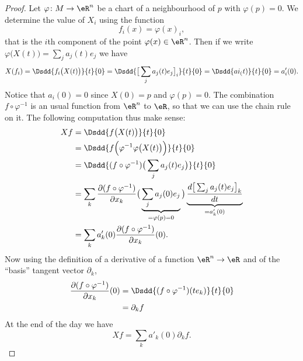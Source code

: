 \begin{proof}
    Let \( \varphi\colon M\to \eR^n\) be a chart of a neighbourhood of \( p\) with \( \varphi(p)=0\). We determine the value of \( X_i\) using the function
    \begin{equation}
        f_i(x)=\varphi(x)_i,
    \end{equation}
    that is the \( i\)th component of the point \( \varphi(x)\in\eR^n\). Then if we write \( \varphi\big( X(t) \big)=\sum_j a_j(t)e_j\) we have
    \begin{subequations}
        \begin{align}
            X(f_i)=\Dsdd{ f_i\big( X(t) \big) }{t}{0}=\Dsdd{ \big[ \sum_ja_j(t)e_j \big]_i }{t}{0}=\Dsdd{ ai_(t) }{t}{0}=a_i'(0).
        \end{align}
    \end{subequations}
    Notice that \( a_i(0)=0\) since \( X(0)=p\) and \( \varphi(p)=0\). The combination \( f\circ\varphi^{-1}\) is an usual function from \( \eR^n\) to \( \eR\), so that we can use the chain rule on it. The following computation thus make sense:
    \begin{subequations}
        \begin{align}
            Xf&=\Dsdd{ f\big( X(t) \big) }{t}{0}\\
            &=\Dsdd{ f\Big( \varphi^{-1}\varphi\big( X(t) \big) \Big) }{t}{0}\\
            &=\Dsdd{ (f\circ\varphi^{-1})\big( \sum_ja_j(t)e_j \big) }{t}{0}\\
            &=\sum_k \frac{ \partial (f\circ\varphi^{-1}) }{ \partial x_k }\big( \underbrace{\sum_ja_j(0)e_j}_{=\varphi(p)=0} \big)\underbrace{\frac{ d\big[ \sum_ja_j(t)e_j \big]_k  }{ dt }}_{=a'_k(0)}\\
            &=\sum_k a'_k(0)\frac{ \partial (f\circ\varphi^{-1}) }{ \partial x_k }(0).
        \end{align}
    \end{subequations}
    Now using the definition of a derivative of a function \( \eR^n\to \eR\) and of the ``basis'' tangent vector \( \partial_k\),
    \begin{subequations}
        \begin{align}
            \frac{ \partial (f\circ\varphi^{-1}) }{ \partial x_k }(0)&=\Dsdd{ (f\circ\varphi^{-1})(te_k) }{t}{0}\\
            &=\partial_k f
        \end{align}
    \end{subequations}
   At the end of the day we have
   \begin{equation}
       Xf=\sum_k a'_k(0)\partial_kf.
   \end{equation}
\end{proof}

